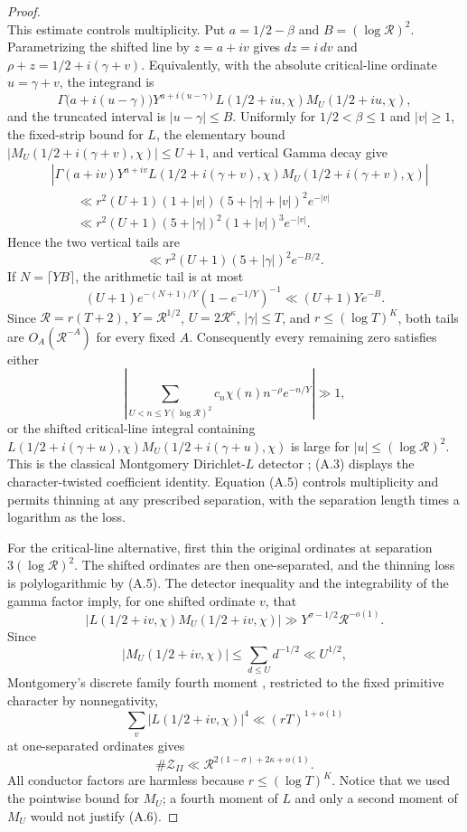 \begin{proof}
\[\]
This estimate controls multiplicity.  Put
$a=1/2-\beta$ and $B=(\log\mathcal R)^2$.  Parametrizing the shifted line by
$z=a+iv$ gives $dz=i\,dv$ and $\rho+z=1/2+i(\gamma+v)$.  Equivalently, with
the absolute critical-line ordinate $u=\gamma+v$, the integrand is
\[
 \Gamma\bigl(a+i(u-\gamma)\bigr)
 Y^{a+i(u-\gamma)}L(1/2+iu,\chi)M_U(1/2+iu,\chi),
\]
and the truncated interval is $|u-\gamma|\le B$.  Uniformly for
$1/2<\beta\le1$ and $|v|\ge1$, the fixed-strip bound for $L$, the elementary
bound $|M_U(1/2+i(\gamma+v),\chi)|\le U+1$, and vertical Gamma decay give
\begin{align*}
 &\left|\Gamma(a+iv)Y^{a+iv}
 L(1/2+i(\gamma+v),\chi)M_U(1/2+i(\gamma+v),\chi)\right| \\
 &\qquad\ll r^2(U+1)(1+|v|)(5+|\gamma|+|v|)^2e^{-|v|} \\
 &\qquad\ll r^2(U+1)(5+|\gamma|)^2(1+|v|)^3e^{-|v|}.
\end{align*}
Hence the two vertical tails are
\[
 \ll r^2(U+1)(5+|\gamma|)^2e^{-B/2}.
\]
If $N=\lceil YB\rceil$, the arithmetic tail is at most
\[
 (U+1)e^{-(N+1)/Y}(1-e^{-1/Y})^{-1}
 \ll (U+1)Y e^{-B}.
\]
Since $\mathcal R=r(T+2)$, $Y=\mathcal R^{1/2}$,
$U=2\mathcal R^\kappa$, $|\gamma|\le T$, and
$r\le(\log T)^K$, both tails are $O_A(\mathcal R^{-A})$ for every fixed
$A$. Consequently every remaining zero satisfies either
\[
 \left|\sum_{U<n\le Y(\log\mathcal R)^2}
 c_n\chi(n)n^{-\rho}e^{-n/Y}\right|\gg1,                        \tag{I}
\]
or the shifted critical-line integral containing
$L(1/2+i(\gamma+u),\chi)M_U(1/2+i(\gamma+u),\chi)$ is large for
$|u|\le(\log\mathcal R)^2$. This is the classical Montgomery
Dirichlet-$L$ detector \cite[Chapters~10 and 12]{Montgomery1971}; (A.3) displays
the character-twisted coefficient identity. Equation (A.5) controls
multiplicity and permits thinning at any prescribed separation, with the
separation length times a logarithm as the loss.

For the critical-line alternative, first thin the original ordinates at
separation $3(\log\mathcal R)^2$. The shifted ordinates are then
one-separated, and the thinning loss is polylogarithmic by (A.5). The detector
inequality and the integrability of the gamma factor imply, for one shifted
ordinate $v$, that
\[
 |L(1/2+iv,\chi)M_U(1/2+iv,\chi)|
 \gg Y^{\sigma-1/2}\mathcal R^{-o(1)}.
\]
Since
\[
 |M_U(1/2+iv,\chi)|\le\sum_{d\le U}d^{-1/2}\ll U^{1/2},
\]
Montgomery's discrete family fourth moment
\cite[Theorem~10.3]{Montgomery1971}, restricted to the fixed primitive character
by nonnegativity,
\[
 \sum_v|L(1/2+iv,\chi)|^4\ll(rT)^{1+o(1)}
\]
at one-separated ordinates gives
\[
 \#\mathcal Z_{II}\ll\mathcal R^{2(1-\sigma)+2\kappa+o(1)}.           \tag{A.6}
\]
All conductor factors are harmless because
$r\le(\log T)^K$. Notice that we used the pointwise bound for $M_U$; a
fourth moment of $L$ and only a second moment of $M_U$ would not justify (A.6).


\end{proof}

